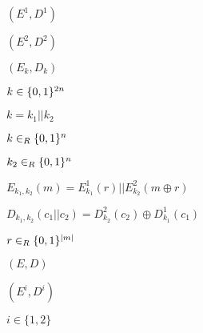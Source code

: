 \documentclass[10pt]{book}
\begin{document}
\begin{mdSnippets}
\begin{mdInlineSnippet}[d013c95d737397f88639b18535a37bb9]
$(E^1,D^1)$\end{mdInlineSnippet}%
\begin{mdInlineSnippet}[2ed3d006214fffeb587c3751cb1f7395]%
$(E^2,D^2)$\end{mdInlineSnippet}%
\begin{mdInlineSnippet}[064c7763c41b1f7ba6113a8d68b55022]%
$(E_k,D_k)$\end{mdInlineSnippet}%
\begin{mdInlineSnippet}[abddcd2339cf9a732c3eb7bc195b06dc]%
$k \in \{0,1\}^{2n}$\end{mdInlineSnippet}%
\begin{mdInlineSnippet}[10d38f254ecd72d6a716c19662539f38]%
$k = k_1 || k_2$\end{mdInlineSnippet}%
\begin{mdInlineSnippet}%
$k \in_R \{0,1\}^{n}$\end{mdInlineSnippet}%
\begin{mdInlineSnippet}[1bc1cbcd473c57a27e18456403d493fa]%
$k_2 \in_R \{0,1\}^n$\end{mdInlineSnippet}%
\begin{mdInlineSnippet}%
$E_{k_1,k_2}(m) = E_{k_1}^1(r) || E^2_{k_2}(m \oplus r)$\end{mdInlineSnippet}%
\begin{mdInlineSnippet}[a48f3192ca99bc8acef5a6490142db80]%
$D_{k_1,k_2}(c_1 || c_2) =D^2_{k_2}(c_2) \oplus D_{k_1}^1(c_1)$\end{mdInlineSnippet}%
\begin{mdInlineSnippet}[6289c45acd3ed327e03ad8bb11bd186a]%
$r \in_R \{0,1\}^{|m|}$\end{mdInlineSnippet}%
\begin{mdInlineSnippet}[c150726dc018e82825c0c3617f46a1c9]%
$(E,D)$\end{mdInlineSnippet}%
\begin{mdInlineSnippet}[118302484ba9871d8acb442d3b5490ec]%
$(E^i,D^i)$\end{mdInlineSnippet}%
\begin{mdInlineSnippet}[c17f6002a86d12cf1f33bb11a88cc755]%
$i \in \{1,2\}$\end{mdInlineSnippet}%

\end{mdSnippets}
\end{document}
